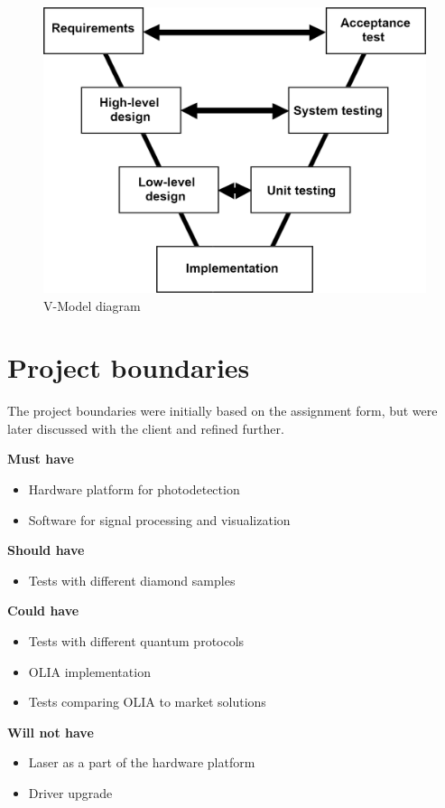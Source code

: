\documentclass{report}
\begin{document}
	\begin{figure}[ht]
		\centering
		\includegraphics[width=0.7\linewidth]{img/vmodel}
		\caption{V-Model diagram}
		\label{fig:vmodel}
	\end{figure}

	\chapter{Project boundaries} \label{project_boundaries}
	The project boundaries were initially based on the assignment form, but were later discussed with the client and refined further. 
	
	\textbf{Must have}
	\begin{itemize}
		\item Hardware platform for photodetection
		\item Software for signal processing and visualization
	\end{itemize}
	
	\textbf{Should have}
	\begin{itemize}
		\item Tests with different diamond samples
	\end{itemize}
	
	\textbf{Could have}
	\begin{itemize}
		\item Tests with different quantum protocols
		\item OLIA implementation
		\item Tests comparing OLIA to market solutions
	\end{itemize}
	
	\textbf{Will not have}
	\begin{itemize}
		\item Laser as a part of the hardware platform
		\item Driver upgrade
	\end{itemize}
	
\end{document}
